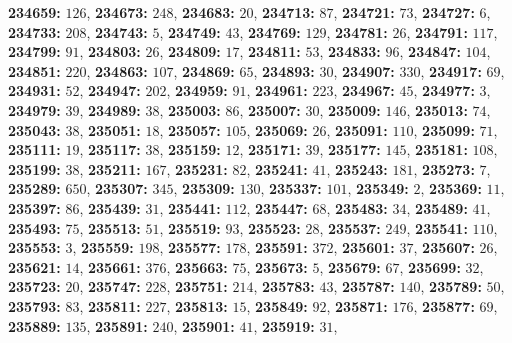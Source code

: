 \textsf{\bfseries 234659:} $126$, \textsf{\bfseries 234673:} $248$, \textsf{\bfseries 234683:} $20$, \textsf{\bfseries 234713:} $87$, \textsf{\bfseries 234721:} $73$, \textsf{\bfseries 234727:} $6$, \textsf{\bfseries 234733:} $208$, \textsf{\bfseries 234743:} $5$, \textsf{\bfseries 234749:} $43$, \textsf{\bfseries 234769:} $129$, \textsf{\bfseries 234781:} $26$, \textsf{\bfseries 234791:} $117$, \textsf{\bfseries 234799:} $91$, \textsf{\bfseries 234803:} $26$, \textsf{\bfseries 234809:} $17$, \textsf{\bfseries 234811:} $53$, \textsf{\bfseries 234833:} $96$, \textsf{\bfseries 234847:} $104$, \textsf{\bfseries 234851:} $220$, \textsf{\bfseries 234863:} $107$, \textsf{\bfseries 234869:} $65$, \textsf{\bfseries 234893:} $30$, \textsf{\bfseries 234907:} $330$, \textsf{\bfseries 234917:} $69$, \textsf{\bfseries 234931:} $52$, \textsf{\bfseries 234947:} $202$, \textsf{\bfseries 234959:} $91$, \textsf{\bfseries 234961:} $223$, \textsf{\bfseries 234967:} $45$, \textsf{\bfseries 234977:} $3$, \textsf{\bfseries 234979:} $39$, \textsf{\bfseries 234989:} $38$, \textsf{\bfseries 235003:} $86$, \textsf{\bfseries 235007:} $30$, \textsf{\bfseries 235009:} $146$, \textsf{\bfseries 235013:} $74$, \textsf{\bfseries 235043:} $38$, \textsf{\bfseries 235051:} $18$, \textsf{\bfseries 235057:} $105$, \textsf{\bfseries 235069:} $26$, \textsf{\bfseries 235091:} $110$, \textsf{\bfseries 235099:} $71$, \textsf{\bfseries 235111:} $19$, \textsf{\bfseries 235117:} $38$, \textsf{\bfseries 235159:} $12$, \textsf{\bfseries 235171:} $39$, \textsf{\bfseries 235177:} $145$, \textsf{\bfseries 235181:} $108$, \textsf{\bfseries 235199:} $38$, \textsf{\bfseries 235211:} $167$, \textsf{\bfseries 235231:} $82$, \textsf{\bfseries 235241:} $41$, \textsf{\bfseries 235243:} $181$, \textsf{\bfseries 235273:} $7$, \textsf{\bfseries 235289:} $650$, \textsf{\bfseries 235307:} $345$, \textsf{\bfseries 235309:} $130$, \textsf{\bfseries 235337:} $101$, \textsf{\bfseries 235349:} $2$, \textsf{\bfseries 235369:} $11$, \textsf{\bfseries 235397:} $86$, \textsf{\bfseries 235439:} $31$, \textsf{\bfseries 235441:} $112$, \textsf{\bfseries 235447:} $68$, \textsf{\bfseries 235483:} $34$, \textsf{\bfseries 235489:} $41$, \textsf{\bfseries 235493:} $75$, \textsf{\bfseries 235513:} $51$, \textsf{\bfseries 235519:} $93$, \textsf{\bfseries 235523:} $28$, \textsf{\bfseries 235537:} $249$, \textsf{\bfseries 235541:} $110$, \textsf{\bfseries 235553:} $3$, \textsf{\bfseries 235559:} $198$, \textsf{\bfseries 235577:} $178$, \textsf{\bfseries 235591:} $372$, \textsf{\bfseries 235601:} $37$, \textsf{\bfseries 235607:} $26$, \textsf{\bfseries 235621:} $14$, \textsf{\bfseries 235661:} $376$, \textsf{\bfseries 235663:} $75$, \textsf{\bfseries 235673:} $5$, \textsf{\bfseries 235679:} $67$, \textsf{\bfseries 235699:} $32$, \textsf{\bfseries 235723:} $20$, \textsf{\bfseries 235747:} $228$, \textsf{\bfseries 235751:} $214$, \textsf{\bfseries 235783:} $43$, \textsf{\bfseries 235787:} $140$, \textsf{\bfseries 235789:} $50$, \textsf{\bfseries 235793:} $83$, \textsf{\bfseries 235811:} $227$, \textsf{\bfseries 235813:} $15$, \textsf{\bfseries 235849:} $92$, \textsf{\bfseries 235871:} $176$, \textsf{\bfseries 235877:} $69$, \textsf{\bfseries 235889:} $135$, \textsf{\bfseries 235891:} $240$, \textsf{\bfseries 235901:} $41$, \textsf{\bfseries 235919:} $31$, 
